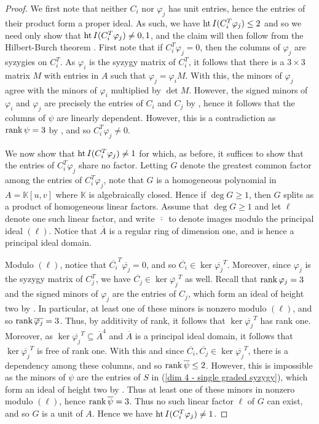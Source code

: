 \documentclass[reqno]{amsart}
\numberwithin{equation}{section}
\theoremstyle{definition}
\def\K{\mathbb{K}}
\def\hgt{\mathop{\rm ht}}
\def\rk{\mathop{\rm rank}}
\begin{document}
\begin{proof}
We first note that neither $C_i$ nor $\varphi_j$ has unit entries, hence the entries of their product form a proper ideal. As such, we have $\hgt I(C_i^T\varphi_j) \leq 2$ and so we need only show that $\hgt I(C_i^T\varphi_j) \neq 0,1$, and the claim will then follow from the Hilbert-Burch theorem \cite[20.15]{Eisenbud}. First note that if $C_i^T\varphi_j =0$, then the columns of $\varphi_j$ are syzygies on $C_i^T$. As $\varphi_i$ is the syzygy matrix of $C_i^T$, it follows that there is a $3\times 3$ matrix $M$ with entries in $A$ such that $\varphi_j = \varphi_i M$. With this, the minors of $\varphi_j$ agree with the minors of $\varphi_i$ multiplied by $\det M$. However, the signed minors of $\varphi_i$ and $\varphi_j$ are precisely the entries of $C_i$ and $C_j$ by , hence it follows that the columns of $\psi$ are linearly dependent. However, this is a contradiction as $\rk \psi =3$ by , and so $C_i^T\varphi_j \neq 0$.

We now show that $\hgt I(C_i^T\varphi_j) \neq 1$ for which, as before, it suffices to show that the entries of $C_i^T\varphi_j$ share no factor. Letting $G$ denote the greatest common factor among the entries of $C_i^T\varphi_j$, note that $G$ is a homogeneous polynomial in $A= \K[u,v]$ where $\K$ is algebraically closed. Hence if $\deg G \geq 1$, then $G$ splits as a product of homogeneous linear factors. Assume that $\deg G \geq 1$ and let $\ell$ denote one such linear factor, and write $\overline{\,\cdot\,}$ to denote images modulo the principal ideal $(\ell)$. Notice that $\overline{A}$ is a regular ring of dimension one, and is hence a principal ideal domain.

Modulo $(\ell)$, notice that $\overline{C_i}^T\overline{\varphi_j} =0$, and so $\overline{C_i} \in \ker \overline{\varphi_j}^T$. Moreover, since $\varphi_j$ is the syzygy matrix of $C_j^T$, we have $\overline{C_j} \in \ker \overline{\varphi_j}^T$ as well. Recall that $\rk \varphi_j =3$ and the signed minors of $\varphi_j$ are the entries of $C_j$, which form an ideal of height two by . In particular, at least one of these minors is nonzero modulo $(\ell)$, and so $\rk \overline{\varphi_j} =3$. Thus, by additivity of rank, it follows that $\ker \overline{\varphi_j}^T$ has rank one. Moreover, as $\ker \overline{\varphi_j}^T \subseteq \overline{A}^4$ and $\overline{A}$ is a principal ideal domain, it follows that $\ker \overline{\varphi_j}^T$ is free of rank one. With this and since $\overline{C_i}, \overline{C_j} \in \ker \overline{\varphi_j}^T$, there is a dependency among these columns, and so $\rk \overline{\psi} \leq 2$. However, this is impossible as the minors of $\psi$ are the entries of $S$ in (\ref{dim 4 - single graded syzygy}), which form an ideal of height two by . Thus at least one of these minors in nonzero modulo $(\ell)$, hence $\rk \overline{\psi} =3$. Thus no such linear factor $\ell$ of $G$ can exist, and so $G$ is a unit of $A$. Hence we have $\hgt I(C_i^T\varphi_j) \neq 1$.
\end{proof}
\end{document}

